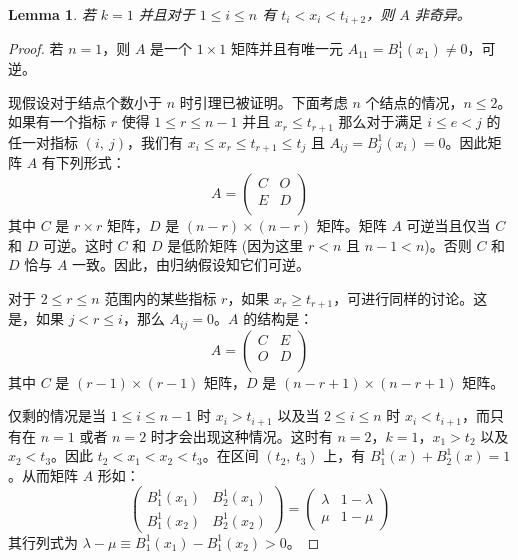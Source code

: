 \documentclass[a4paper]{article}
\newtheorem{lemma}{Lemma}
\begin{document}
    \begin{lemma}
        若 $k = 1$ 并且对于 $1 \leqslant i \leqslant n$ 有 $t_{i} < x_{i} < t_{i+2}$，则 $A$ 非奇异。
    \end{lemma}
    \begin{proof}
        若 $n = 1$，则 $A$ 是一个 $1 \times 1$ 矩阵并且有唯一元 $A_{11} = B_1^1 (x_1) \neq 0$，可逆。

        现假设对于结点个数小于 $n$ 时引理已被证明。下面考虑 $n$ 个结点的情况，$n \leqslant 2$。如果有一个指标 $r$ 使得 $1 \leqslant r \leqslant n-1$ 并且 $x_{r} \leqslant t_{r+1}$ 那么对于满足 $i \leqslant e < j$ 的任一对指标 $(i,\ j)$，我们有 $x_{i} \leqslant x_{r} \leqslant t_{r+1} \leqslant t_{j}$ 且 $A_{ij} = B_j^1 (x_i) = 0$。因此矩阵 $A$ 有下列形式：
        \begin{equation*}
            A = \begin{pmatrix}
                C & O \\
                E & D \\
            \end{pmatrix}
        \end{equation*}
        其中 $C$ 是 $r \times r$ 矩阵，$D$ 是 $(n-r) \times (n-r)$ 矩阵。矩阵 $A$ 可逆当且仅当 $C$ 和 $D$ 可逆。这时 $C$ 和 $D$ 是低阶矩阵 (因为这里 $r < n$ 且 $n-1 < n$)。否则 $C$ 和 $D$ 恰与 $A$ 一致。因此，由归纳假设知它们可逆。

        对于 $2 \leqslant r \leqslant n$ 范围内的某些指标 $r$，如果 $x_{r} \geqslant t_{r+1}$，可进行同样的讨论。这是，如果 $j < r \leqslant i$，那么 $A_{ij} = 0$。$A$ 的结构是：
        \begin{equation*}
            A = \begin{pmatrix}
                C & E \\
                O & D \\
            \end{pmatrix}
        \end{equation*}
        其中 $C$ 是 $(r-1) \times (r-1)$ 矩阵，$D$ 是 $(n-r+1) \times (n-r+1)$ 矩阵。

        仅剩的情况是当 $1 \leqslant i \leqslant n-1$ 时 $x_{i} > t_{i+1}$ 以及当 $2 \leqslant i \leqslant n$ 时 $x_{i} < t_{i+1}$，而只有在 $n = 1$ 或者 $n = 2$ 时才会出现这种情况。这时有 $n = 2$，$k = 1$，$x_1 > t_2$ 以及 $x_2 < t_3$。因此 $t_2 < x_1 < x_2 < t_3$。在区间 $(t_2,\ t_3)$ 上，有 $B_1^1 (x) + B_2^1 (x) = 1$。从而矩阵 $A$ 形如：
        \begin{equation*}
            \begin{pmatrix}
                B_1^1 (x_1) & B_2^1 (x_1) \\
                B_1^1 (x_2) & B_2^1 (x_2)                
            \end{pmatrix} = \begin{pmatrix}
                \lambda & 1 - \lambda \\
                \mu & 1 - \mu
            \end{pmatrix}
        \end{equation*}
        其行列式为 $\lambda - \mu \equiv B_1^1 (x_1) - B_1^1 (x_2) > 0$。
    \end{proof}
\end{document}
